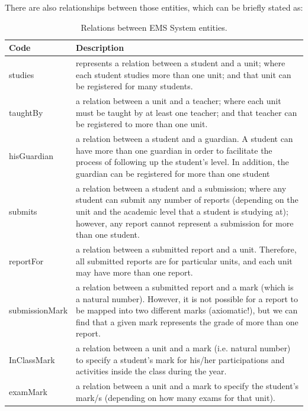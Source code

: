 There are also relationships between those entities, which can be briefly stated as:

\begin{table}[bth]
\centering
\caption{Relations between EMS System entities.}
\small
{}
\begin{tabular}{p{0.9 in} p{5.9 in}} \hline 
\hline
Code & Description\\\hline\hline

studies &   represents a relation between a student and a unit; where each student studies more than one unit; and that unit can be registered for many students. \\

taughtBy &  a relation between a unit and a teacher; where each unit must be taught by at least one teacher; and that teacher can be registered to more than one unit.\\

hisGuardian &  a relation between a student and a guardian.  A student can have more than one guardian in order to facilitate the process of following up the student’s level.  In addition, the guardian can be registered for more than one student\\

submits &   a relation between a student and a submission; where any student can submit any number of reports (depending on the unit and the academic level that a student is studying at); however, any report cannot represent a submission for more than one student.\\

reportFor &  a relation between a submitted report and a unit.  Therefore, all submitted reports are for particular units, and each unit may have more than one report. \\

submissionMark &  a relation between a submitted report and a mark (which is a natural number).  However, it is not possible for a report to be mapped into two different marks (axiomatic!), but we can find that a given mark represents the grade of more than one report.\\

InClassMark &  a relation between a unit and a mark (i.e. natural number) to specify a student’s mark for his/her participations and activities inside the class during the year. \\

examMark &  a relation between a unit and a mark to specify the student’s mark/s (depending on how many exams for that unit).\\ 


\end{tabular}
\end{table}
